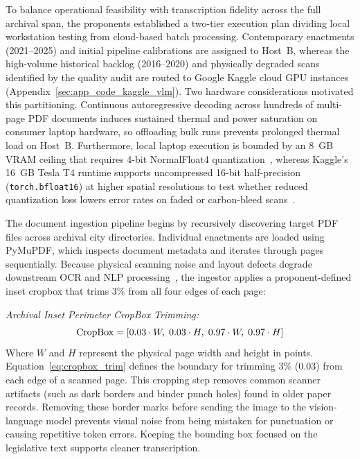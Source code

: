         To balance operational feasibility with transcription fidelity across the full archival span, the proponents established a two-tier execution plan dividing local workstation testing from cloud-based batch processing. Contemporary enactments (2021--2025) and initial pipeline calibrations are assigned to Host~B, whereas the high-volume historical backlog (2016--2020) and physically degraded scans identified by the quality audit are routed to Google Kaggle cloud GPU instances~\cite{kaggle2026,bisong2019kaggle} (Appendix~\ref{sec:app_code_kaggle_vlm}). Two hardware considerations motivated this partitioning. Continuous autoregressive decoding across hundreds of multi-page PDF documents induces sustained thermal and power saturation on consumer laptop hardware, so offloading bulk runs prevents prolonged thermal load on Host~B. Furthermore, local laptop execution is bounded by an 8~GB VRAM ceiling that requires 4-bit NormalFloat4 quantization~\cite{dettmers2024qlora}, whereas Kaggle's 16~GB Tesla T4 runtime supports uncompressed 16-bit half-precision (\texttt{torch.bfloat16}) at higher spatial resolutions to test whether reduced quantization loss lowers error rates on faded or carbon-bleed scans~\cite{zheng2025empiricalstudyqwen3quantization,bai2025qwen25vl,baird1993defect}.

        The document ingestion pipeline begins by recursively discovering target PDF files across archival city directories. Individual enactments are loaded using PyMuPDF, which inspects document metadata and iterates through pages sequentially. Because physical scanning noise and layout defects degrade downstream OCR and NLP processing~\cite{baird1993defect,lopresti2008optical}, the ingestor applies a proponent-defined inset cropbox that trims 3\% from all four edges of each page:

        \noindent\textit{Archival Inset Perimeter CropBox Trimming:}
        \begin{equation}
            \text{CropBox} = \left[ 0.03 \cdot W, \; 0.03 \cdot H, \; 0.97 \cdot W, \; 0.97 \cdot H \right]
            \label{eq:cropbox_trim}
            \eqcaption{Archival Inset Perimeter CropBox Trimming}
        \end{equation}
        \noindent Where $W$ and $H$ represent the physical page width and height in points. Equation~\ref{eq:cropbox_trim} defines the boundary for trimming 3\% ($0.03$) from each edge of a scanned page. This cropping step removes common scanner artifacts (such as dark borders and binder punch holes) found in older paper records. Removing these border marks before sending the image to the vision-language model prevents visual noise from being mistaken for punctuation or causing repetitive token errors. Keeping the bounding box focused on the legislative text supports cleaner transcription.


